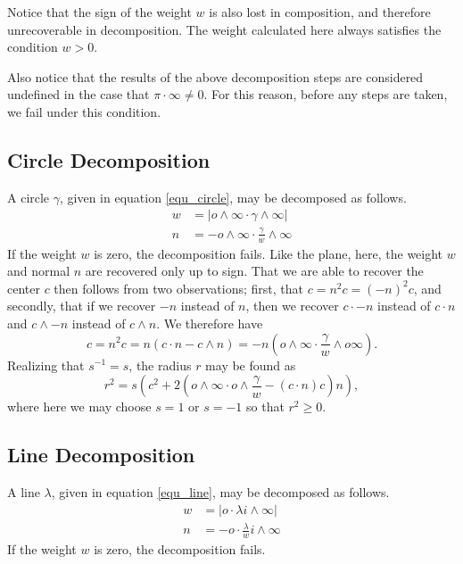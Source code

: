 \documentclass[12pt]{article}
\newcommand{\nvao}{o}
\newcommand{\nvai}{\infty}
\begin{document}
Notice that the sign of the weight $w$ is also lost in composition, and therefore
unrecoverable in decomposition.  The weight calculated here always satisfies
the condition $w>0$.

Also notice that the results of the above decomposition steps are considered
undefined in the case that $\pi\cdot\nvai\neq 0$.  For this reason, before
any steps are taken, we fail under this condition.

\subsection{Circle Decomposition}

A circle $\gamma$, given in equation \eqref{equ_circle}, may be decomposed as follows.
\begin{align}
w &= |\nvao\wedge\nvai\cdot\gamma\wedge\nvai| \\
n &= -\nvao\wedge\nvai\cdot\frac{\gamma}{w}\wedge\nvai
\end{align}
If the weight $w$ is zero, the decomposition fails.
Like the plane, here, the weight $w$ and normal $n$ are recovered
only up to sign.  That we are able to recover the center $c$ then follows
from two observations; first, that $c=n^2c=(-n)^2c$, and secondly,
that if we recover $-n$ instead of $n$, then we recover $c\cdot -n$
instead of $c\cdot n$ and $c\wedge -n$ instead of $c\wedge n$.
We therefore have
\begin{equation}
c = n^2c=n(c\cdot n-c\wedge n)=-n\left(\nvao\wedge\nvai\cdot
\frac{\gamma}{w}\wedge\nvao\nvai\right).
\end{equation}
Realizing that $s^{-1}=s$, the radius $r$ may be found as
\begin{equation}
r^2=s\left(c^2+2\left(\nvao\wedge\nvai\cdot\nvao\wedge\frac{\gamma}{w}-
(c\cdot n)c\right)n\right),
\end{equation}
where here we may choose $s=1$ or $s=-1$ so that $r^2\geq 0$.

\subsection{Line Decomposition}


A line $\lambda$, given in equation \eqref{equ_line}, may be decomposed
as follows.
\begin{align}
w &= |\nvao\cdot\lambda i\wedge\nvai| \\
n &= -\nvao\cdot\frac{\lambda}{w}i\wedge\nvai
\end{align}
If the weight $w$ is zero, the decomposition fails.
\end{document}
